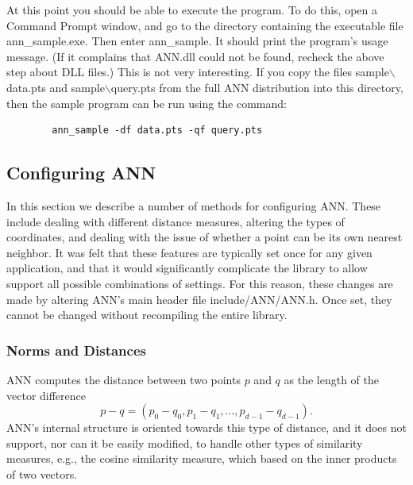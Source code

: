 \documentclass[11pt]{article}		%
\newcommand{\ANN}[0]{\textsf{ANN}}
\newcommand{\BSL}{\hbox{$\backslash$}}
\begin{document}
At this point you should be able to execute the program.  To do this,
open a Command Prompt window, and go to the directory containing the
executable file \textsf{ann\_sample.exe}.  Then enter
\textsf{ann\_sample}.  It should print the program's usage message.
(If it complains that \textsf{ANN.dll} could not be found, recheck the
above step about DLL files.)  This is not very interesting.  If you copy
the files \textsf{sample{\BSL}data.pts} and
\textsf{sample{\BSL}query.pts} from the full {\ANN} distribution into this
directory, then the sample program can be run using the command:
\begin{verbatim}
        ann_sample -df data.pts -qf query.pts
\end{verbatim}

\subsection{Configuring {\ANN}}\label{custom.sec}

In this section we describe a number of methods for configuring {\ANN}.
These include dealing with different distance measures, altering the
types of coordinates, and dealing with the issue of whether a point
can be its own nearest neighbor.  It was felt that these features are
typically set once for any given application, and that it would
significantly complicate the library to allow support all possible
combinations of settings.  For this reason, these changes are made by
altering {\ANN}'s main header file \textsf{include/ANN/ANN.h}.  Once set,
they cannot be changed without recompiling the entire library.

\subsubsection{Norms and Distances}\label{norm.sec}

{\ANN} computes the distance between two points $p$ and $q$ as the length
of the vector difference
\[
	p-q = (p_0 - q_0, p_1 - q_1, \ldots, p_{d-1}-q_{d-1}).
\]
{\ANN}'s internal structure is oriented towards this type of distance,
and it does not support, nor can it be easily modified, to handle other
types of similarity measures, e.g., the cosine similarity measure, which
based on the inner products of two vectors.
\end{document}
